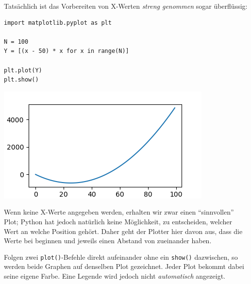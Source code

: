 Tatsächlich ist das Vorbereiten von X-Werten \emph{streng genommen} sogar überflüssig:

\begin{codebox}[Beispiel: Einfacher Plot ohne X-Werte, width=.55\linewidth, nobeforeafter, equal height group = grpXmpSimplePlotSansX]
\begin{verbatim}
import matplotlib.pyplot as plt

N = 100
Y = [(x - 50) * x for x in range(N)]

plt.plot(Y)
plt.show()
\end{verbatim}
\end{codebox}
%
\begin{tcolorbox}[title=Ausgabe: Einfacher Plot ohne X-Werte, width=.45\linewidth, nobeforeafter, equal height group = grpXmpSimplePlotSansX]
	\includegraphics[width=\linewidth]{./gfx/plt-square}
\end{tcolorbox}

Wenn keine X-Werte angegeben werden, erhalten wir zwar einen \enquote{sinnvollen} Plot; Python hat jedoch natürlich keine Möglichkeit, zu entscheiden, welcher Wert an welche Position gehört. Daher geht der Plotter hier davon aus, dass die Werte bei  beginnen und jeweils einen Abstand von  zueinander haben.

Folgen zwei \texttt{plot()}-Befehle direkt aufeinander ohne ein \texttt{show()} dazwischen, so werden beide Graphen auf denselben Plot gezeichnet. Jeder Plot bekommt dabei seine eigene Farbe. Eine Legende wird jedoch nicht \emph{automatisch} angezeigt.

